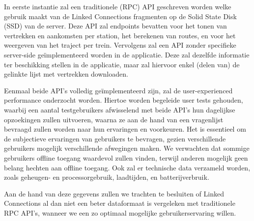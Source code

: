 In eerste instantie zal een traditionele (RPC) API geschreven worden welke gebruik maakt van de Linked Connections fragmenten op de Solid State Disk (SSD) van de server. Deze API zal endpoints bevatten voor het tonen van vertrekken en aankomsten per station, het berekenen van routes, en voor het weergeven van het traject per trein. 
Vervolgens zal een API zonder specifieke server-side geïmplementeerd worden in de applicatie. Deze zal dezelfde informatie ter beschikking stellen in de applicatie, maar zal hiervoor enkel (delen van) de gelinkte lijst met vertrekken downloaden. 

Eenmaal beide API's volledig geïmplementeerd zijn, zal de user-experienced performance onderzocht worden. Hiertoe worden begeleide user tests gehouden, waarbij een aantal testgebruikers afwisselend met beide API's hun dagelijkse opzoekingen zullen uitvoeren, waarna ze aan de hand van een vragenlijst bevraagd zullen worden naar hun ervaringen en voorkeuren. Het is essentieel om de subjectieve ervaringen van gebruikers te bevragen, gezien verschillende gebruikers mogelijk verschillende afwegingen maken. We verwachten dat sommige gebruikers offline toegang waardevol zullen vinden, terwijl anderen mogelijk geen belang hechten aan offline toegang. Ook zal er technische data verzameld worden, zoals geheugen- en processorgebruik, laadtijden, en batterijverbruik. 

Aan de hand van deze gegevens zullen we trachten te besluiten of Linked Connections al dan niet een beter dataformaat is vergeleken met traditionele RPC API's, wanneer we een zo optimaal mogelijke gebruikerservaring willen.